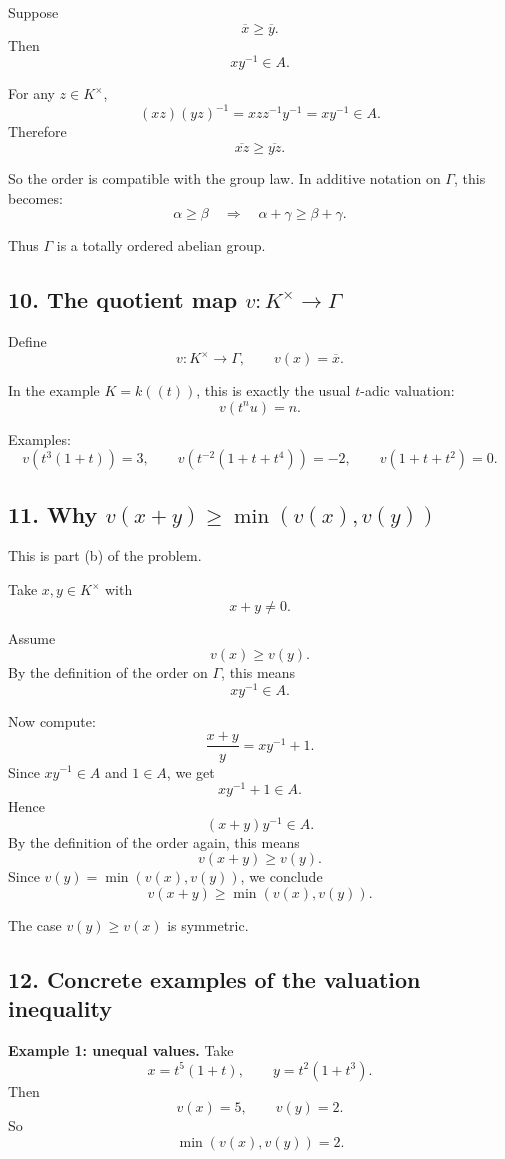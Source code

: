 \documentclass[12pt,a4paper]{article}
\theoremstyle{notespace}
\begin{document}
Suppose
\[
\overline x \ge \overline y.
\]
Then
\[
xy^{-1}\in A.
\]

For any \(z\in K^\times\),
\[
(xz)(yz)^{-1}
=
xzz^{-1}y^{-1}
=
xy^{-1}\in A.
\]
Therefore
\[
\overline{xz}\ge \overline{yz}.
\]

So the order is compatible with the group law. In additive notation on \(\Gamma\), this becomes:
\[
\alpha\ge \beta
\quad \Longrightarrow \quad
\alpha+\gamma\ge \beta+\gamma.
\]

Thus \(\Gamma\) is a totally ordered abelian group.

\subsection{10. The quotient map \(v:K^\times\to \Gamma\)}

Define
\[
v:K^\times\to \Gamma,
\qquad
v(x)=\overline x.
\]

In the example \(K=k((t))\), this is exactly the usual \(t\)-adic valuation:
\[
v(t^n u)=n.
\]

Examples:
\[
v(t^3(1+t))=3,
\qquad
v(t^{-2}(1+t+t^4))=-2,
\qquad
v(1+t+t^2)=0.
\]

\subsection{11. Why \(v(x+y)\ge \min(v(x),v(y))\)}

This is part (b) of the problem.

Take \(x,y\in K^\times\) with
\[
x+y\neq 0.
\]

Assume
\[
v(x)\ge v(y).
\]
By the definition of the order on \(\Gamma\), this means
\[
xy^{-1}\in A.
\]

Now compute:
\[
\frac{x+y}{y}=xy^{-1}+1.
\]
Since \(xy^{-1}\in A\) and \(1\in A\), we get
\[
xy^{-1}+1\in A.
\]
Hence
\[
(x+y)y^{-1}\in A.
\]
By the definition of the order again, this means
\[
v(x+y)\ge v(y).
\]
Since \(v(y)=\min(v(x),v(y))\), we conclude
\[
v(x+y)\ge \min(v(x),v(y)).
\]

The case \(v(y)\ge v(x)\) is symmetric.

\subsection{12. Concrete examples of the valuation inequality}

\textbf{Example 1: unequal values.}
Take
\[
x=t^5(1+t),
\qquad
y=t^2(1+t^3).
\]
Then
\[
v(x)=5,
\qquad
v(y)=2.
\]
So
\[
\min(v(x),v(y))=2.
\]
\end{document}
